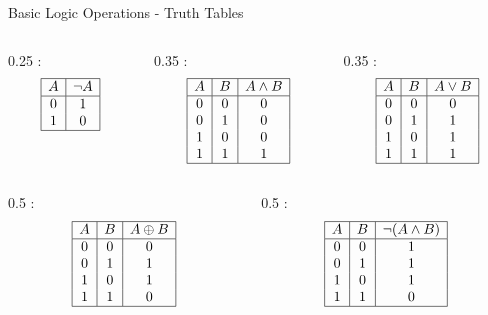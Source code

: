 \begin{frame}{Basic Logic Operations - Truth Tables}
\begin{columns}
\begin{column}{0.25\textwidth}
:
\[
\begin{array}{|c|c|}
\hline
A & \neg A \\
\hline
0 & 1 \\
1 & 0 \\
\hline
\end{array}
\]
\end{column}
\begin{column}{0.35\textwidth}
:
\[
\begin{array}{|c|c|c|}
\hline
A & B & A \land B \\
\hline
0 & 0 & 0 \\
0 & 1 & 0 \\
1 & 0 & 0 \\
1 & 1 & 1 \\
\hline
\end{array}
\]
\end{column}
\begin{column}{0.35\textwidth}
:
\[
\begin{array}{|c|c|c|}
\hline
A & B & A \lor B \\
\hline
0 & 0 & 0 \\
0 & 1 & 1 \\
1 & 0 & 1 \\
1 & 1 & 1 \\
\hline
\end{array}
\]
\end{column}
\end{columns}

\vspace{0.5cm}
\begin{columns}
\begin{column}{0.5\textwidth}
:
\[
\begin{array}{|c|c|c|}
\hline
A & B & A \oplus B \\
\hline
0 & 0 & 0 \\
0 & 1 & 1 \\
1 & 0 & 1 \\
1 & 1 & 0 \\
\hline
\end{array}
\]
\end{column}
\begin{column}{0.5\textwidth}
:
\[
\begin{array}{|c|c|c|}
\hline
A & B & \neg(A \land B) \\
\hline
0 & 0 & 1 \\
0 & 1 & 1 \\
1 & 0 & 1 \\
1 & 1 & 0 \\
\hline
\end{array}
\]
\end{column}
\end{columns}
\end{frame}


